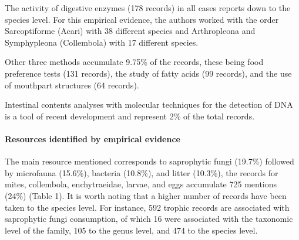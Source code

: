 \documentclass[10pt,oneside]{article}
\begin{document}
The activity of digestive enzymes (178 records) in all cases reports
down to the species level. For this empirical evidence, the authors
worked with the order Sarcoptiforme (Acari) with 38 different species
and Arthropleona and Symphypleona (Collembola) with 17 different
species.

Other three methods accumulate 9.75\% of the records, these being food
preference tests (131 records), the study of fatty acids (99 records),
and the use of mouthpart structures (64 records).

Intestinal contents analyses with molecular techniques for the detection
of DNA is a tool of recent development and represent 2\% of the total
records.

\hypertarget{resources-identified-by-empirical-evidence}{%
\paragraph{Resources identified by empirical
evidence}\label{resources-identified-by-empirical-evidence}}

The main resource mentioned corresponds to saprophytic fungi (19.7\%)
followed by microfauna (15.6\%), bacteria (10.8\%), and litter (10.3\%),
the records for mites, collembola, enchytraeidae, larvae, and eggs
accumulate 725 mentions (24\%) (Table 1). It is worth noting that a
higher number of records have been taken to the species level. For
instance, 592 trophic records are associated with saprophytic fungi
consumption, of which 16 were associated with the taxonomic level of the
family, 105 to the genus level, and 474 to the species level.
\end{document}
